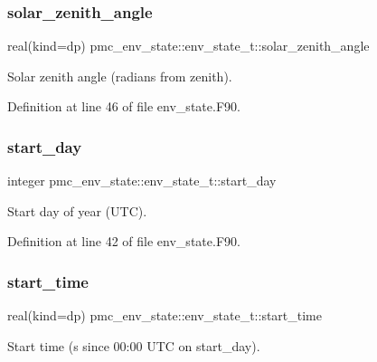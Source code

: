 \subsubsection{\texorpdfstring{solar\+\_\+zenith\+\_\+angle}{solar\_zenith\_angle}}
{\footnotesize\ttfamily real(kind=dp) pmc\+\_\+env\+\_\+state\+::env\+\_\+state\+\_\+t\+::solar\+\_\+zenith\+\_\+angle}



Solar zenith angle (radians from zenith). 



Definition at line 46 of file env\+\_\+state.\+F90.

\mbox{\label{structpmc__env__state_1_1env__state__t_a014af9d840b16306c0a328feccdc7d56}} 
\subsubsection{\texorpdfstring{start\+\_\+day}{start\_day}}
{\footnotesize\ttfamily integer pmc\+\_\+env\+\_\+state\+::env\+\_\+state\+\_\+t\+::start\+\_\+day}



Start day of year (U\+TC). 



Definition at line 42 of file env\+\_\+state.\+F90.

\mbox{\label{structpmc__env__state_1_1env__state__t_a43c6794a03b478d86902bdc7b52f3d80}} 
\subsubsection{\texorpdfstring{start\+\_\+time}{start\_time}}
{\footnotesize\ttfamily real(kind=dp) pmc\+\_\+env\+\_\+state\+::env\+\_\+state\+\_\+t\+::start\+\_\+time}



Start time (s since 00\+:00 U\+TC on {\ttfamily start\+\_\+day}). 




